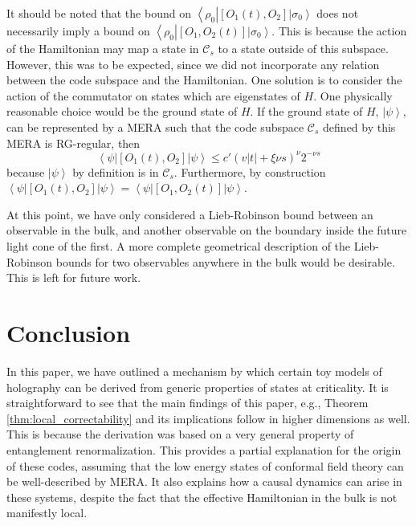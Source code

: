\documentclass[a4paper,11pt]{article}
\newcommand{\bra}[1]{\left\langle #1 \right|}
\newcommand{\ket}[1]{\left|#1\right\rangle}
\newcommand{\1}{\mathbbm{1}}
\newcommand{\cC}{\mathcal{C}}
\begin{document}
It should be noted that the bound on $\bra{\rho_0}[O_1(t),O_2] \ket{\sigma_0}$ does not necessarily imply a bound on $\bra{\rho_0} [O_1,O_2(t)]\ket{\sigma_0}$. This is because the action of
the Hamiltonian may map a state in $\cC_s$ to a state outside of this subspace. However, this was to be expected, since we did not incorporate any relation between the code subspace and the
Hamiltonian. One solution is to consider the action of the commutator on states which are eigenstates of $H$. One physically reasonable choice would be the ground state of $H$. If the ground state
of $H$, $\ket{\psi}$, can be represented by a MERA such that the code subspace $\cC_s$ defined by this MERA is RG-regular, then
\begin{equation}
	\bra{\psi} [O_1(t),O_2]\ket{\psi} \leq c'(v|t|+\xi \nu s)^{\nu} 2^{-\nu s}
\end{equation}
because $\ket{\psi}$ by definition is in $\cC_s$. Furthermore, by construction $\bra{\psi}[O_1(t),O_2]\ket{\psi}=\bra{\psi}[O_1,O_2(t)]\ket{\psi}$.





At this point, we have only considered a Lieb-Robinson bound between an observable in the bulk, and another observable on the boundary inside the future light cone of the first. A more complete geometrical description of the Lieb-Robinson bounds for two observables anywhere in the bulk would be desirable. This is left for future work.






\section{Conclusion\label{section:conclusion}}
In this paper, we have outlined a mechanism by which certain toy models of holography can be derived from  generic properties of states at criticality. It is straightforward to see that the main findings of this paper, e.g., Theorem \ref{thm:local_correctability} and its implications follow in higher dimensions as well. This is because the derivation was based on a very general property of entanglement renormalization. This provides a partial explanation for the origin of these codes, assuming that the low energy states of conformal field theory can be well-described by MERA. It also explains how a causal dynamics can arise in these systems, despite the fact that the effective Hamiltonian in the bulk is not manifestly local.
\end{document}
